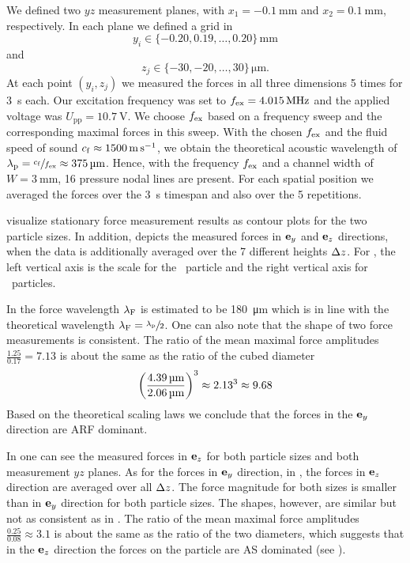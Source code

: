 We defined two $yz$ measurement planes, with $x_{1} = \SI{-0.1}{\mm}$ and 
$x_{2} = \SI{0.1}{\mm}$, respectively. In each plane we defined a grid in
\[ y_{i}\in\{-0.20,0.19,\dots,0.20\}\,\si{\mm} \]
and
\[ z_{j}\in\{-30,-20,\dots,30\}\,\si{\um}. \]
At each point $(y_{i}, z_{j})$ we measured the forces in all three dimensions 5 
times for \SI{3}{\second} each.  Our excitation frequency was set to $\fex = 
\SI{4.015}{\MHz}$ and the applied voltage was $U_{\text{pp}} = 
\SI{10.7}{\volt}$. We choose $f_{\mathrm{ex}}$ based on a frequency sweep and the 
corresponding maximal forces in this sweep. With the chosen $f_{\mathrm{ex}}$ and the 
fluid speed of sound $c_{\mathrm{f}} \approx \SI{1500}{\meter\per\second}$, we obtain the 
theoretical acoustic wavelength of $\lambda_{\mathrm{p}} = \sfrac{c_{\mathrm{f}}}{f_{\mathrm{ex}}} \approx 
\SI{375}{\si{\micro\meter}}$. Hence, with the frequency $f_{\mathrm{ex}}$ and a channel width of $W = 
\SI{3}{\mm}$, 16 pressure nodal lines are present. For each spatial position we 
averaged the forces over the \SI{3}{\second} timespan and also over the 5 
repetitions.

 visualize stationary force measurement 
results as contour plots for the two particle sizes. In addition, 
 depicts the measured forces in $\vb{e}_{y}$ and 
$\vb{e}_{z}$ directions, when the data is additionally averaged over the 7 different 
heights $\Delta z$. For , the left vertical axis 
is the scale for the \Dfour~particle and the right vertical axis for 
\Dtwo~particles.

In  the force wavelength $\lambda_{\mathrm{F}}$ is estimated to be 
\SI{180}{\um} which is in line with the theoretical wavelength $\lambda_{\mathrm{F}} = 
\sfrac{\lambda_{\mathrm{p}}}{2}$. One can also note that the shape of two force measurements is 
consistent. The ratio of the mean maximal force amplitudes $\frac{1.25}{0.17} = 
7.13$ is about the same as the ratio of the cubed diameter
\begin{equation}
  {\left( \frac{\SI{4.39}{\micro\meter}}{\SI{2.06}{\micro\meter}} \right)}^{3} \approx 2.13^{3} \approx 9.68
 \label{eq:TC-ARF-AS-scaling}
\end{equation}
Based on the theoretical scaling laws we conclude that the forces in the $\vb{e}_{y}$ 
direction are ARF dominant.


In  one can see the measured forces in $\vb{e}_{z}$ for both particle 
sizes and both measurement $yz$ planes. As for the forces in $\vb{e}_{y}$ direction, 
in , the forces in $\vb{e}_{z}$ direction are averaged over all 
$\Delta z$. The force magnitude for both sizes is smaller than in $\vb{e}_{y}$ direction 
for both particle sizes. The shapes, however, are similar but not as consistent 
as in . The ratio of the mean maximal force amplitudes 
$\frac{0.25}{0.08} \approx 3.1$ is about the same as the ratio of the two 
diameters, which suggests that in the $\vb{e}_{z}$ direction the forces on the 
particle are AS dominated (see ).

